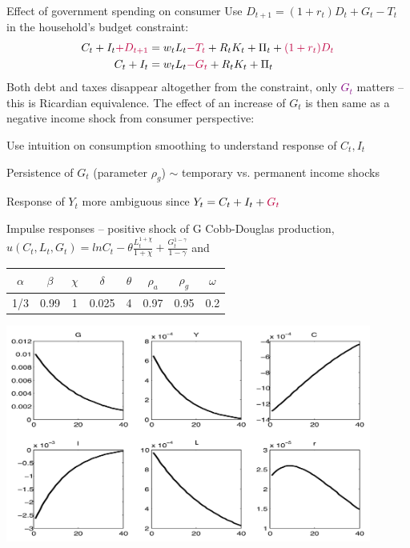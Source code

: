 \documentclass{beamer}
\newenvironment{mytemize}
{\vfill\itemize[nolistsep,itemsep=\fill,label=\color{blue}{$\triangleright$}]}
  {\enditemize}
\begin{document}
\begin{frame}{Effect of government spending on consumer}
  Use $D_{t+1} = (1+r_t) D_t + G_t - T_t$ in the household's budget constraint:
  \begin{align*}
	C_{t}+I_t\textcolor{purple}{+D_{t+1}} &=  w_{t} L_{t}\textcolor{purple}{- T_t} +R_{t} K_{t} +\Pi_{t}+\textcolor{purple}{(1+r_{t}) D_{t}} \\
	C_{t}+I_t &=  w_{t} L_{t}\textcolor{purple}{- G_t} +R_{t} K_{t} +\Pi_{t}
  \end{align*}
  Both debt and taxes disappear altogether from the constraint, only \textcolor{purple}{$G_t$} matters -- this is Ricardian equivalence.
\vfill
The effect of an increase of $G_t$ is then same as a negative income shock from consumer perspective:
\begin{mytemize}
\item Use intuition on consumption smoothing to understand response of $C_t, I_t$
\item Persistence of $G_t$ (parameter $\rho_g$) $\sim$ temporary vs. permanent income shocks
\item Response of $Y_t$ more ambiguous since $Y_t = C_t + I_t +\textcolor{purple}{G_t}$ 
\end{mytemize}
\end{frame}

\begin{frame}{Impulse responses -- positive shock of G}
  Cobb-Douglas production,  $u(C_t, L_t, G_t) = ln C_t - \theta \frac{L_t^{1+\chi}}{1+\chi} + \frac{G_t^{1-\gamma}}{1-\gamma}$ and 
  \centering
  \begin{tabular}{|c|c|c|c|c|c|c|c|}
	\hline
  $\alpha$ & $\beta$& $\chi$ & $\delta$& $\theta$ & $\rho_a$& $\rho_g$&$\omega$ \\
	\hline
  1/3 & 0.99 & 1 & 0.025 & 4 & 0.97 & 0.95 & 0.2 \\
	\hline
  \end{tabular}
  \includegraphics[width = 0.9\textwidth]{FIGURES/G_RBC_IRF.png}
\end{frame}
\end{document}
